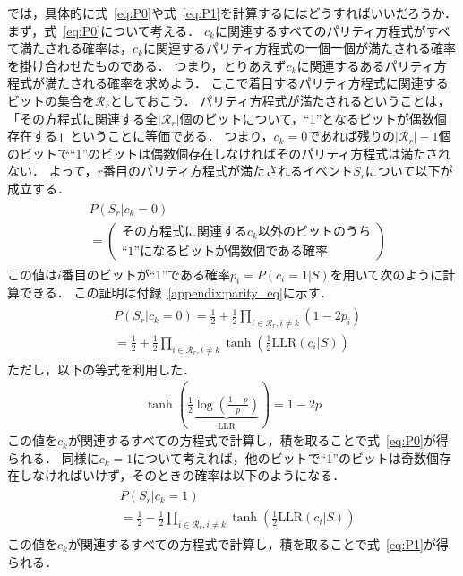 \documentclass[twocolumn, a4paper]{ieicejsp}
\newcommand{\ABS}[1]{\left|#1\right|}
\newcommand{\brkts}[1]{\left(#1\right)}
\begin{document}
では，具体的に式~\eqref{eq:P0}や式~\eqref{eq:P1}を計算するにはどうすればいいだろうか．
まず，式~\eqref{eq:P0}について考える．
$c_k$に関連するすべてのパリティ方程式がすべて満たされる確率は，$c_k$に関連するパリティ方程式の一個一個が満たされる確率を掛け合わせたものである．
つまり，とりあえず$c_k$に関連するあるパリティ方程式が満たされる確率を求めよう．
ここで着目するパリティ方程式に関連するビットの集合を$\mathcal{R}_r$としておこう．
パリティ方程式が満たされるということは，「その方程式に関連する全$\ABS{\mathcal{R}_r}$個のビットについて，``1''となるビットが偶数個存在する」ということに等価である．
つまり，$c_k=0$であれば残りの$\ABS{\mathcal{R}_r}-1$個のビットで``1''のビットは偶数個存在しなければそのパリティ方程式は満たされない．
よって，$r$番目のパリティ方程式が満たされるイベント$S_r$について以下が成立する．
\begin{align}
  \begin{split}
    &P(S_r|c_k=0)\\
    &= \brkts{\begin{array}{l}
      \text{その方程式に関連する$c_k$以外のビットのうち}\\
      \text{``1''になるビットが偶数個である確率}
    \end{array}}
  \end{split}
\end{align}
この値は$i$番目のビットが``1''である確率$p_i=P(c_i=1|S)$を用いて次のように計算できる．
この証明は付録~\ref{appendix:parity_eq}に示す．
\begin{align}
  \begin{split}
    &P(S_r|c_k=0) = \frac{1}{2} + \frac{1}{2} \prod_{i \in \mathcal{R}_r, i \not= k} (1 - 2p_i) \\
    &= \frac{1}{2} + \frac{1}{2} \prod_{i \in \mathcal{R}_r, i \not= k} \tanh\brkts{\frac{1}{2} \mathrm{LLR}(c_i|S) }
  \end{split}
\end{align}
ただし，以下の等式を利用した．
\begin{align}
  \tanh\brkts{\frac{1}{2} \underbrace{\log \brkts{\frac{1-p}{p}}}_{\mathrm{LLR}} } = 1 - 2p
\end{align}
この値を$c_k$が関連するすべての方程式で計算し，積を取ることで式~\eqref{eq:P0}が得られる．
同様に$c_k=1$について考えれば，他のビットで``1''のビットは奇数個存在しなければいけず，そのときの確率は以下のようになる．
\begin{align}
  \begin{split}
    &P(S_r|c_k=1)\\
    &= \frac{1}{2} - \frac{1}{2} \prod_{i \in \mathcal{R}_r, i \not= k} \tanh\brkts{\frac{1}{2} \mathrm{LLR}(c_i|S) }
  \end{split}
\end{align}
この値を$c_k$が関連するすべての方程式で計算し，積を取ることで式~\eqref{eq:P1}が得られる．
\end{document}
